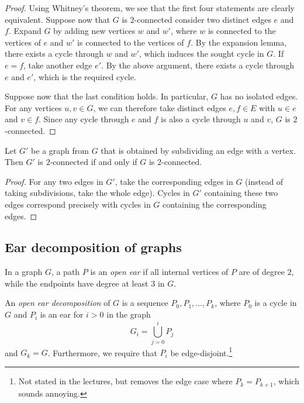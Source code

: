 \begin{proof}
Using Whitney's theorem, we see that the first four statements are
clearly equivalent. Suppose now that $G$ is $2$-connected 
consider two distinct edges $e$ and $f$. Expand $G$ by adding new
vertices $w$ and $w'$, where $w$ is connected to the vertices of
$e$ and $w'$ is connected to the vertices of $f$. By the expansion
lemma, there exists a cycle through $w$ and $w'$, which induces the
sought cycle in $G$. If $e = f$, take another edge $e'$. By the
above argument, there exists a cycle through $e$ and $e'$, which is
the required cycle.

Suppose now that the last condition holds. In particular, $G$ has
no isolated edges. For any vertices $u, v \in G$, we can therefore
take distinct edges $e, f \in E$ with $u \in e$ and $v \in f$.
Since any cycle through $e$ and $f$ is also a cycle through $u$ and
$v$, $G$ is $2$-connected.
\end{proof}

\begin{lema}[Subdivision]
Let $G'$ be a graph from $G$ that is obtained by subdividing an
edge with a vertex. Then $G'$ is $2$-connected if and only if $G$
is $2$-connected.
\end{lema}

\begin{proof}
For any two edges in $G'$, take the corresponding edges in $G$
(instead of taking subdivisions, take the whole edge). Cycles in
$G'$ containing these two edges correspond precisely with cycles in
$G$ containing the corresponding edges.
\end{proof}

\newpage

\subsection{Ear decomposition of graphs}

\begin{definicija}
In a graph $G$, a path $P$ is an \emph{open ear} if all
internal vertices of $P$ are of degree $2$, while the endpoints
have degree at least $3$ in $G$.
\end{definicija}

\begin{definicija}
An \emph{open ear decomposition} of $G$ is
a sequence $P_0, P_1, \dots, P_k$, where $P_0$ is a cycle in $G$
and $P_i$ is an ear for $i > 0$ in the graph
\[
G_i = \bigcup_{j=0}^i P_j
\]
and $G_k = G$. Furthermore, we require that $P_i$ be
edge-disjoint.\footnote{Not stated in the lectures, but removes the
edge case where $P_k = P_{k+1}$, which sounds annoying.}
\end{definicija}


